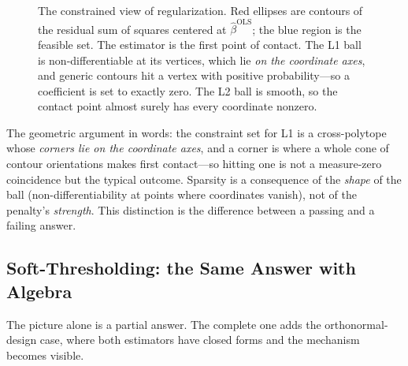 \begin{figure}[H]
\caption{The constrained view of regularization. Red ellipses are contours of the residual sum of squares centered at $\hat\beta^{\text{OLS}}$; the blue region is the feasible set. The estimator is the first point of contact. The L1 ball is non-differentiable at its vertices, which lie \emph{on the coordinate axes}, and generic contours hit a vertex with positive probability---so a coefficient is set to exactly zero. The L2 ball is smooth, so the contact point almost surely has every coordinate nonzero.}
\label{cml:fig:l1l2geometry}
\end{figure}

The geometric argument in words: the constraint set for L1 is a cross-polytope whose \emph{corners lie on the coordinate axes}, and a corner is where a whole cone of contour orientations makes first contact---so hitting one is not a measure-zero coincidence but the typical outcome. Sparsity is a consequence of the \emph{shape} of the ball (non-differentiability at points where coordinates vanish), not of the penalty's \emph{strength}. This distinction is the difference between a passing and a failing answer.

\subsection{Soft-Thresholding: the Same Answer with Algebra}

The picture alone is a partial answer. The complete one adds the orthonormal-design case, where both estimators have closed forms and the mechanism becomes visible.

